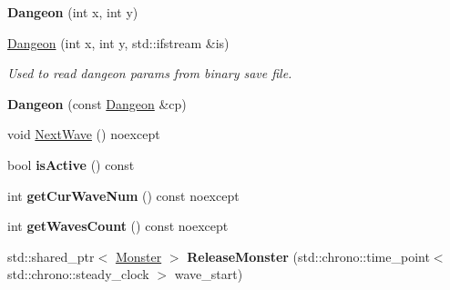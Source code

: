 \begin{DoxyCompactItemize}
\item 
\mbox{\label{classbase__structures_1_1Dangeon_a1f3d447cdeb6379ae39d3163f0b081ef}} 
{\bfseries Dangeon} (int x, int y)
\item 
\mbox{\label{classbase__structures_1_1Dangeon_aa2f7f887eddd0707b5476ceb86a3d743}} 
\hyperlink{classbase__structures_1_1Dangeon_aa2f7f887eddd0707b5476ceb86a3d743}{Dangeon} (int x, int y, std\+::ifstream \&is)
\begin{DoxyCompactList}\small\item\em Used to read dangeon params from binary save file. \end{DoxyCompactList}\item 
\mbox{\label{classbase__structures_1_1Dangeon_a90a437b23f5fbfa4a61351a3cc0b0630}} 
{\bfseries Dangeon} (const \hyperlink{classbase__structures_1_1Dangeon}{Dangeon} \&cp)
\item 
void \hyperlink{classbase__structures_1_1Dangeon_aa1d44555dd5611253aa0f6196be99238}{Next\+Wave} () noexcept
\item 
\mbox{\label{classbase__structures_1_1Dangeon_a1426d3e716ce87739a04cebe1406692a}} 
bool {\bfseries is\+Active} () const
\item 
\mbox{\label{classbase__structures_1_1Dangeon_a276ffb8f27ec375e0e6d52d49736b8cd}} 
int {\bfseries get\+Cur\+Wave\+Num} () const noexcept
\item 
\mbox{\label{classbase__structures_1_1Dangeon_af62631eba5c7802985f6eccec116d932}} 
int {\bfseries get\+Waves\+Count} () const noexcept
\item 
\mbox{\label{classbase__structures_1_1Dangeon_a581b32153dba6f74d65fdb1009686b94}} 
std\+::shared\+\_\+ptr$<$ \hyperlink{classbase__structures_1_1Monster}{Monster} $>$ {\bfseries Release\+Monster} (std\+::chrono\+::time\+\_\+point$<$ std\+::chrono\+::steady\+\_\+clock $>$ wave\+\_\+start)
\item 
\mbox{\label{classbase__structures_1_1Dangeon_a45b26326b01975edcece729f7131bd6a}} 

\end{DoxyCompactItemize}
